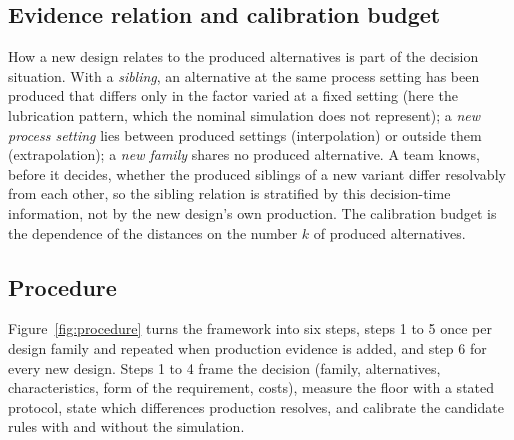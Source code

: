 \documentclass[pdflatex,sn-basic,lineno]{sn-jnl}
\begin{document}
\subsection{Evidence relation and calibration budget}\label{sec:budget}

How a new design relates to the produced alternatives is part of the decision situation. With a \emph{sibling}, an alternative at the same process setting has been produced that differs only in the factor varied at a fixed setting (here the lubrication pattern, which the nominal simulation does not represent); a \emph{new process setting} lies between produced settings (interpolation) or outside them (extrapolation); a \emph{new family} shares no produced alternative. A team knows, before it decides, whether the produced siblings of a new variant differ resolvably from each other, so the sibling relation is stratified by this decision-time information, not by the new design's own production. The calibration budget is the dependence of the distances on the number $k$ of produced alternatives.

\subsection{Procedure}\label{sec:procedure}

Figure~\ref{fig:procedure} turns the framework into six steps, steps 1 to 5 once per design family and repeated when production evidence is added, and step 6 for every new design. Steps 1 to 4 frame the decision (family, alternatives, characteristics, form of the requirement, costs), measure the floor with a stated protocol, state which differences production resolves, and calibrate the candidate rules with and without the simulation.
\end{document}
